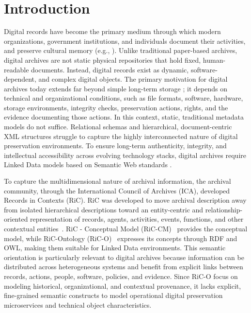 \documentclass[runningheads]{llncs}
\begin{document}
\section{Introduction}
Digital records have become the primary medium through which modern organizations, government institutions, and individuals document their activities, and preserve cultural memory (e.g., \cite{hawkins2022archives}).
Unlike traditional paper-based archives, digital archives are not static physical repositories that hold fixed, human-readable documents. Instead, digital records exist as dynamic, software-dependent, and complex digital objects. The primary motivation for digital archives today extends far beyond simple long-term storage \cite{gattuso2017preservation}; it depends on technical and organizational conditions, such as file formats, software, hardware, storage environments, integrity checks, preservation actions, rights, and the evidence documenting those actions.
In this context, static, traditional metadata models do not suffice. Relational schemas and hierarchical, document-centric XML structures struggle to capture the highly interconnected nature of digital preservation environments. To ensure long-term authenticity, integrity, and intellectual accessibility across evolving technology stacks, digital archives require Linked Data models based on Semantic Web standards \cite{bizer2023linked}. 


To capture the multidimensional nature of archival information, the archival community, through the International Council of Archives (ICA), developed Records in Contexts (RiC). RiC was developed to move archival description away from isolated hierarchical descriptions toward an entity-centric and relationship-oriented representation of records, agents, activities, events, functions, and other contextual entities~\cite{llanes2017records}. RiC - Conceptual Model (RiC-CM)~\cite{RICCM}
provides the conceptual model, while RiC-Ontology (RiC-O)~\cite{RiCO} expresses its concepts through RDF and OWL, making them suitable for Linked Data environments. This semantic orientation is particularly relevant to digital archives because information can be distributed across heterogeneous systems and benefit from explicit links between records, actions, people, software, policies, and evidence. Since RiC-O focus on modeling historical, organizational, and contextual provenance, it lacks explicit, fine-grained semantic constructs to model operational digital preservation microservices and technical object characteristics. 
\end{document}
